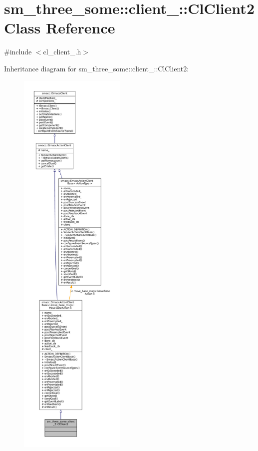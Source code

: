\hypertarget{classsm__three__some_1_1client__2_1_1ClClient2}{}\section{sm\+\_\+three\+\_\+some\+:\+:client\+\_\+:\+:Cl\+Client2 Class Reference}
\label{classsm__three__some_1_1client__2_1_1ClClient2}


{\ttfamily \#include $<$cl\+\_\+client\+\_.\+h$>$}



Inheritance diagram for sm\+\_\+three\+\_\+some\+:\+:client\+\_\+:\+:Cl\+Client2\+:
\nopagebreak
\begin{figure}[H]
\begin{center}
\leavevmode
\includegraphics[height=550pt]{classsm__three__some_1_1client__2_1_1ClClient2__inherit__graph}
\end{center}
\end{figure}



